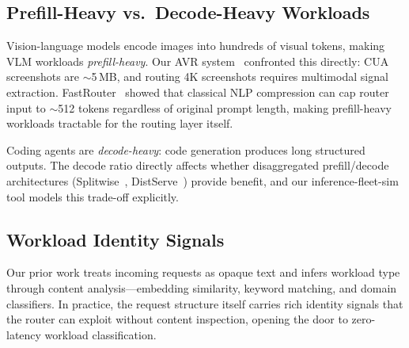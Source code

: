 \subsection{Prefill-Heavy vs.\ Decode-Heavy Workloads}
\label{sec:workload:prefill-decode}

Vision-language models encode images into hundreds of visual tokens,
making VLM workloads \emph{prefill-heavy}.  Our AVR
system~\cite{avr2026} confronted this directly: CUA screenshots are
$\sim$5\,MB, and routing 4K screenshots requires multimodal signal
extraction.  FastRouter~\cite{fastrouter2026} showed that classical
NLP compression can cap router input to $\sim$512 tokens regardless
of original prompt length, making prefill-heavy workloads tractable
for the routing layer itself.

Coding agents are \emph{decode-heavy}: code generation produces long
structured outputs.  The decode ratio directly affects whether
disaggregated prefill/decode architectures
(Splitwise~\cite{patel2024splitwise},
DistServe~\cite{zhong2024distserve}) provide benefit, and our
inference-fleet-sim~\cite{fleetsim2026} tool models this trade-off
explicitly.


\subsection{Workload Identity Signals}
\label{sec:workload:identity}

Our prior work treats incoming requests as opaque text and infers
workload type through content analysis---embedding similarity,
keyword matching, and domain classifiers.  In practice, the request
structure itself carries rich identity signals that the router can
exploit without content inspection, opening the door to
zero-latency workload classification.

